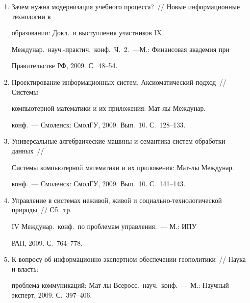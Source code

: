 \begin{enumerate}[1.]


\item {}


Зачем нужна модернизация учебного процесса?~// Новые информационные технологии в 


образовании: Докл.\ и выступления участников IX 


Междунар.\ науч.-прак\-тич.\ конф.\ Ч.~2.~---М.: Финансовая академия при 


Правительстве РФ, 2009.  С.~48--54.





\item {}


Проектирование информационных систем. Аксиоматический подход~// Системы 


компьютерной математики и их приложения: Мат-лы Междунар.\ 


конф.~--- Смоленск: СмолГУ, 2009. Вып.~10. С.~128--133.





\item {}


Универсальные алгебраические машины и семантика систем обработки данных~// 


Системы компьютерной математики и их приложения: Мат-лы Междунар.\ 


конф.~--- Смоленск: СмолГУ, 2009. Вып.~10. С.~141--143.





\item {}


Управление в системах неживой, живой и социально-технологической природы~// Сб.\ тр.\ 


IV Меж\-ду\-нар.\ конф.\ по проблемам управления.~--- М.: ИПУ 


РАН, 2009. С.~764--778.





\item {}


К вопросу об информационно-экспертном обеспечении геополитики~// Наука и власть: 


проблема коммуникаций: Мат-лы Всеросс.\ науч.\ конф.~--- М.: Научный эксперт, 2009. С.~397--406.






\end{enumerate}
